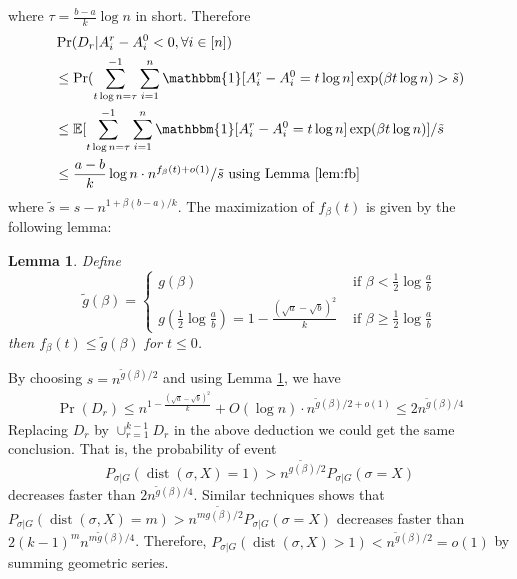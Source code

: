 \documentclass[conference]{IEEEtran}
\newtheorem{lemma}{Lemma}
\DeclareMathOperator{\dist}{dist}
\begin{document}
where $\tau =\frac{b-a}{k}\log n$ in short. Therefore
\begin{align*}
&\Pr(D_r | A_i^r - A_i^0  < 0, \forall i\in [n])  \\
&\leq\Pr(\sum_{t\log n =\tau}^{-1}\sum_{i=1}^n \mathbbm{1}[A^r_i - A^0_i = t\log n]\exp ( \beta  t\log n)  > \tilde{s} ) \\
& \leq \mathbb{E}[\sum_{t\log n =\tau}^{-1}\sum_{i=1}^n \mathbbm{1}[A^r_i - A^0_i= t\log n]\exp ( \beta  t\log n)] /  \tilde{s} \\
& \leq \frac{a-b}{k}\log n \cdot n^{f_{\beta}(t) + o(1)} / \tilde{s} \textrm{ using Lemma \ref{lem:fb} }
\end{align*}
where $\tilde{s} = s - n^{1+\beta(b-a)/k}$. 
The maximization of $f_{\beta}(t)$ is given by the following lemma:
\begin{lemma}\label{lem:tilde_g}
Define
$$
\tilde{g}(\beta) = \begin{cases}
g(\beta)   & \text{~if~} \beta< \frac{1}{2}\log\frac{a}{b} \\
g(\frac{1}{2} \log\frac{a}{b}) = 1 - \frac{(\sqrt{a}-\sqrt{b})^2}{k} & \text{~if~} \beta\ge \frac{1}{2}\log\frac{a}{b}
\end{cases}
$$
then $f_{\beta}(t) \leq \tilde{g}(\beta)$ for $t\leq 0$.
\end{lemma}
By choosing $s = n^{\tilde{g}(\beta)/2}$ and using Lemma \ref{lem:tilde_g}, we have
\begin{align*}
\Pr( D_r) \leq  n^{1-\frac{(\sqrt{a}-\sqrt{b})^2}{k}} + O(\log n)  \cdot n^{\tilde{g}(\beta)/2 + o(1)} \leq 2n^{\tilde{g}(\beta)/4}
\end{align*}
Replacing $D_r$ by $\cup_{r=1}^{k-1} D_r$ in the above deduction we could get the same conclusion.
That is, the probability of event
$$
P_{\sigma | G}(\dist(\sigma, X) = 1) > n^{\tilde{g(\beta)}/2}P_{\sigma | G}(\sigma = X)\label{eq:betastar_xx}
$$
decreases faster than $2n^{\tilde{g}(\beta)/4}$.
Similar techniques shows that $P_{\sigma | G}(\dist(\sigma, X) = m)> n^{m\tilde{g(\beta)}/2}P_{\sigma | G}(\sigma = X)$
decreases faster than $2(k-1)^m n^{m\tilde{g}(\beta)/4}$. Therefore, $P_{\sigma | G}(\dist(\sigma, X) > 1) < n^{\tilde{g}(\beta)/2} = o(1)$ by summing geometric series.
\end{document}
